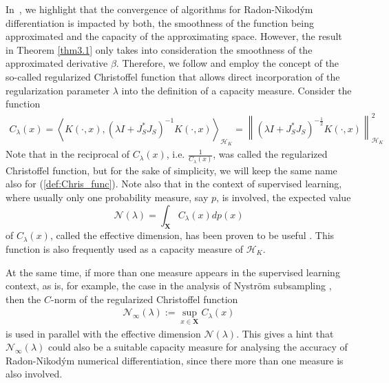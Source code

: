 \documentclass[USenglish]{article}
\newcommand{\norm}[1]{\left\lVert#1\right\rVert}
\newcommand{\innerpro}[1]{\left\langle#1\right\rangle}
\newcommand{\bX}{\mathbf{X}}
\newcommand{\lam}{\lambda}
\newcommand{\hk}{{\mathcal{H}_K}}
\newcommand{\ie}{i.e. }
\begin{document}
In~\cite{nguyen2023regularized}, we highlight that the convergence of algorithms for Radon-Nikod\'ym differentiation is impacted by both, the smoothness of the function being approximated and the capacity of the approximating space. However, the result in Theorem \ref{thm3.1} only takes into consideration the smoothness of the approximated derivative $\beta$. Therefore, we follow \cite{pauwels2018} and employ the concept of the so-called regularized Christoffel function that allows direct incorporation of the regularization parameter $\lam$ into the definition of a capacity measure.
Consider the function 
\begin{align}\label{def:Chris_func}
	C_\lam (x) = \innerpro{K(\cdot,x), (\lambda I +J_{S}^* J_{S} )^{-1} K(\cdot,x) }_{\mathcal{H}_K} = \norm{(\lambda I + J_S^* J_S)^{-\frac{1}{2}} K(\cdot,x) }^2_{\mathcal{H}_K}
\end{align}
Note that in \cite{pauwels2018} the reciprocal of $C_\lam (x)$, \ie $\frac{1}{C_\lam (x)}$, was called the regularized Christoffel function, but for the sake of simplicity, we will keep the same name also for (\ref{def:Chris_func}). Note also that in the context of supervised learning, where usually only one probability measure, say $p$, is involved, the expected value
\[
\mathcal{N} (\lam) = \int_\bX C_\lam (x) d p(x)
\]
of $C_\lam (x)$, called the effective dimension, has been proven to be useful \cite{caponnetto2007}. This function is also frequently used as a capacity measure of $\hk$.

At the same time, if more than one measure appears in the supervised learning context, as is, for example, the case in the analysis of Nystr{\"o}m subsampling \cite{rudi2015, shuai2019Analysis}, then the $C$-norm of the regularized Christoffel function 
\begin{align}\label{def:N_inf}
	\mathcal{N}_\infty (\lambda) := \sup_{x \in \mathbf{X}} C_\lambda (x) 
\end{align}
is used in parallel with the effective dimension $\mathcal{N} (\lambda)$. This gives a hint that $\mathcal{N}_\infty (\lambda)$ could also be a suitable capacity measure for analysing the accuracy of Radon-Nikod\'ym numerical differentiation, since there more than one measure is also involved.
\end{document}
